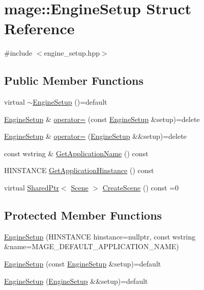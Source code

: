 \hypertarget{structmage_1_1_engine_setup}{}\section{mage\+:\+:Engine\+Setup Struct Reference}
\label{structmage_1_1_engine_setup}


{\ttfamily \#include $<$engine\+\_\+setup.\+hpp$>$}

\subsection*{Public Member Functions}
\begin{DoxyCompactItemize}
\item 
virtual \hyperlink{structmage_1_1_engine_setup_a77de1ad7e922dec4791b558d20616b08}{$\sim$\+Engine\+Setup} ()=default
\item 
\hyperlink{structmage_1_1_engine_setup}{Engine\+Setup} \& \hyperlink{structmage_1_1_engine_setup_ad7066882519b59ca533293f743334508}{operator=} (const \hyperlink{structmage_1_1_engine_setup}{Engine\+Setup} \&setup)=delete
\item 
\hyperlink{structmage_1_1_engine_setup}{Engine\+Setup} \& \hyperlink{structmage_1_1_engine_setup_a9ca25ff88af30786022964916790a497}{operator=} (\hyperlink{structmage_1_1_engine_setup}{Engine\+Setup} \&\&setup)=delete
\item 
const wstring \& \hyperlink{structmage_1_1_engine_setup_a63fed5e978c020ebc9d5080fe6fcefdc}{Get\+Application\+Name} () const
\item 
H\+I\+N\+S\+T\+A\+N\+CE \hyperlink{structmage_1_1_engine_setup_a2d9220896adfe924ac72165b4e2b13cf}{Get\+Application\+Hinstance} () const
\item 
virtual \hyperlink{namespacemage_a1e01ae66713838a7a67d30e44c67703e}{Shared\+Ptr}$<$ \hyperlink{classmage_1_1_scene}{Scene} $>$ \hyperlink{structmage_1_1_engine_setup_a004fce6a741fc68c8f6feed546d9f220}{Create\+Scene} () const =0
\end{DoxyCompactItemize}
\subsection*{Protected Member Functions}
\begin{DoxyCompactItemize}
\item 
\hyperlink{structmage_1_1_engine_setup_a5a19cf91bfd8cea940abbbbbdd1828a1}{Engine\+Setup} (H\+I\+N\+S\+T\+A\+N\+CE hinstance=nullptr, const wstring \&name=M\+A\+G\+E\+\_\+\+D\+E\+F\+A\+U\+L\+T\+\_\+\+A\+P\+P\+L\+I\+C\+A\+T\+I\+O\+N\+\_\+\+N\+A\+ME)
\item 
\hyperlink{structmage_1_1_engine_setup_a40980f5fce1554c2a93707efdf4486a9}{Engine\+Setup} (const \hyperlink{structmage_1_1_engine_setup}{Engine\+Setup} \&setup)=default
\item 
\hyperlink{structmage_1_1_engine_setup_a6b150bbb4bff7971939a2f327ba760fe}{Engine\+Setup} (\hyperlink{structmage_1_1_engine_setup}{Engine\+Setup} \&\&setup)=default
\end{DoxyCompactItemize}
